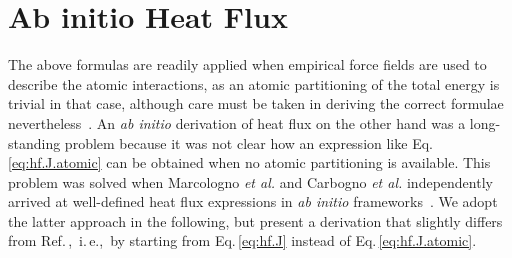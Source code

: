 \section{Ab initio Heat Flux}
The above formulas are readily applied when empirical force fields are used to describe the atomic interactions, as an atomic partitioning of the total energy is trivial in that case, although care must be taken in deriving the correct formulae nevertheless~\cite{Fan2015,Boone2019}. An \emph{ab initio} derivation of heat flux on the other hand was a long-standing problem because it was not clear how an expression like Eq.\,\eqref{eq:hf.J.atomic} can be obtained when no atomic partitioning is available. This problem was solved when Marcologno \emph{et al.} and Carbogno \emph{et al.} independently arrived at well-defined heat flux expressions in \emph{ab initio} frameworks~\cite{Marcolongo2016,Carbogno2016}. We adopt the latter approach in the following, but present a derivation that slightly differs from Ref.\,\cite{Carbogno2016},~i.\,e.,~by starting from Eq.\,\eqref{eq:hf.J} instead of Eq.\,\eqref{eq:hf.J.atomic}.

